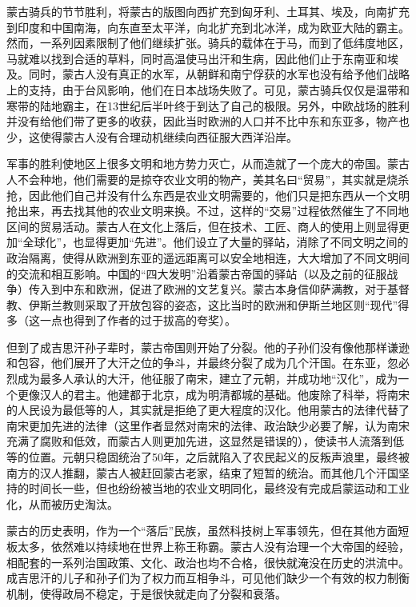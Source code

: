 蒙古骑兵的节节胜利，将蒙古的版图向西扩充到匈牙利、土耳其、埃及，向南扩充到印度和中国南海，向东直至太平洋，向北扩充到北冰洋，成为欧亚大陆的霸主。然而，一系列因素限制了他们继续扩张。骑兵的载体在于马，而到了低纬度地区，马就难以找到合适的草料，同时高温使马出汗和生病，因此他们止于东南亚和埃及。同时，蒙古人没有真正的水军，从朝鲜和南宁俘获的水军也没有给予他们战略上的支持，由于台风影响，他们在日本战场失败了。可见，蒙古骑兵仅仅是温带和寒带的陆地霸主，在13世纪后半叶终于到达了自己的极限。另外，中欧战场的胜利并没有给他们带了更多的收获，因此当时欧洲的人口并不比中东和东亚多，物产也少，这使得蒙古人没有合理动机继续向西征服大西洋沿岸。

军事的胜利使地区上很多文明和地方势力灭亡，从而造就了一个庞大的帝国。蒙古人不会种地，他们需要的是掠夺农业文明的物产，美其名曰“贸易”，其实就是烧杀抢，因此他们自己并没有什么东西是农业文明需要的，他们只是把东西从一个文明抢出来，再去找其他的农业文明来换。不过，这样的“交易”过程依然催生了不同地区间的贸易活动。蒙古人在文化上落后，但在技术、工匠、商人的使用上则显得更加“全球化”，也显得更加“先进”。他们设立了大量的驿站，消除了不同文明之间的政治隔离，使得从欧洲到东亚的遥远距离可以安全地相连，大大增加了不同文明间的交流和相互影响。中国的“四大发明”沿着蒙古帝国的驿站（以及之前的征服战争）传入到中东和欧洲，促进了欧洲的文艺复兴。蒙古本身信仰萨满教，对于基督教、伊斯兰教则采取了开放包容的姿态，这比当时的欧洲和伊斯兰地区则“现代”得多（这一点也得到了作者的过于拔高的夸奖）。

但到了成吉思汗孙子辈时，蒙古帝国则开始了分裂。他的子孙们没有像他那样谦逊和包容，他们展开了大汗之位的争斗，并最终分裂了成为几个汗国。在东亚，忽必烈成为最多人承认的大汗，他征服了南宋，建立了元朝，并成功地“汉化”，成为一个更像汉人的君主。他建都于北京，成为明清都城的基础。他废除了科举，将南宋的人民设为最低等的人，其实就是拒绝了更大程度的汉化。他用蒙古的法律代替了南宋更加先进的法律（这里作者显然对南宋的法律、政治缺少必要了解，认为南宋充满了腐败和低效，而蒙古人则更加先进，这显然是错误的），使读书人流落到低等的位置。元朝只稳固统治了50年，之后就陷入了农民起义的反叛声浪里，最终被南方的汉人推翻，蒙古人被赶回蒙古老家，结束了短暂的统治。而其他几个汗国坚持的时间长一些，但也纷纷被当地的农业文明同化，最终没有完成启蒙运动和工业化，从而被历史淘汰。

蒙古的历史表明，作为一个“落后”民族，虽然科技树上军事领先，但在其他方面短板太多，依然难以持续地在世界上称王称霸。蒙古人没有治理一个大帝国的经验，相配套的一系列治国政策、文化、政治也均不合格，很快就淹没在历史的洪流中。成吉思汗的儿子和孙子们为了权力而互相争斗，可见他们缺少一个有效的权力制衡机制，使得政局不稳定，于是很快就走向了分裂和衰落。


